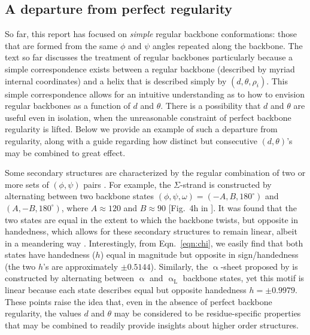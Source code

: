 \documentclass[fleqn,10pt,lineno]{wlpeerj} %
\newcommand{\n}[1]{{\color{blue}#1}}
\newcommand{\Eqn}[1]{Eqn.~\ref{#1}}
\newcommand{\h}{h}
\begin{document}
\n{
\subsection*{A departure from perfect regularity}

So far, this report has focused on {\it simple} regular backbone conformations: those that are formed from the same $\phi$ and $\psi$ angles repeated along the backbone. The text so far discusses the treatment of regular backbones particularly because a simple correspondence exists between a regular backbone (described by myriad internal coordinates) and a helix that is described simply by $(d,\theta,\rho_i)$. This simple correspondence allows for an intuitive understanding as to how to envision regular backbones as a function of $d$ and $\theta$. There is a possibility that $d$ and $\theta$ are useful even in isolation, when the unreasonable constraint of perfect backbone regularity is lifted. Below we provide an example of such a departure from regularity, along with a guide regarding how distinct but consecutive $(d,\theta)$'s may be combined to great effect. 

Some secondary structures are characterized by the regular combination of two or more sets of $(\phi,\psi)$ pairs \citep{Pauling1951a, Pauling1951b, Armen2004, Daggett2006, Hayward2008, Mannige2015, Mannige2016}. For example, the $\Sigma$-strand is constructed by alternating between two backbone states $(\phi,\psi,\omega)=(-A,B,180^\circ)$ and $(A,-B,180^\circ)$, where $A \approx 120$ and $B \approx 90$ [Fig.~4h in \cite{Mannige2015}]. It was found that the two states are equal in the extent to which the backbone twists, but opposite in handedness, which allows for these secondary structures to remain linear, albeit in a meandering way \citep{Mannige2015}. Interestingly, from \Eqn{eqn:chi}, we easily find that both states have handedness ($\h$) equal in magnitude but opposite in sign/handedness (the two $\h$'s are approximately $\pm 0.5144$). Similarly, the $\upalpha$-sheet proposed by \cite{Pauling1951b} is constructed by alternating between $\upalpha$ and $\upalpha_\textrm{L}$ backbone states,  yet this motif is linear because each state describes equal but opposite handedness $\h=\pm 0.9979$. These points raise the idea that, even in the absence of perfect backbone regularity, the values $d$ and $\theta$ may be considered to be residue-specific properties that may be combined to readily provide insights about higher order structures. %
}
\end{document}
